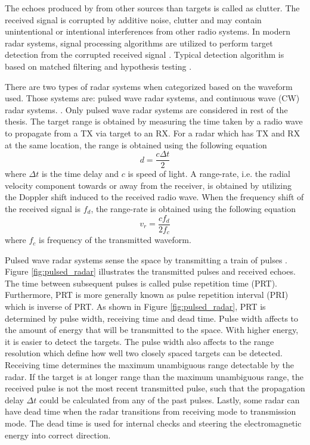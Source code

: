 \documentclass[english, 12pt, a4paper, elec, utf8, a-1b, online]{aaltothesis}
\newcommand{\dt}{\Delta t}
\begin{document}
The echoes produced by from other sources than targets is called as clutter.
The received signal is corrupted by additive noise, clutter and may contain unintentional or intentional interferences from other radio systems.
In modern radar systems, signal processing algorithms are utilized to perform target detection from the corrupted received signal \cite{Mahafza2015}.
Typical detection algorithm is based on matched filtering and hypothesis testing \cite{Mahafza2015}.

There are two types of radar systems when categorized based on the waveform used.
Those systems are: pulsed wave radar systems, and continuous wave (CW) radar systems.  \cite{Mahafza2015}.
Only pulsed wave radar systems are considered in rest of the thesis.
The target range is obtained by measuring the time taken by a radio wave to propagate from a TX via target to an RX.
For a radar which has TX and RX at the same location, the range is obtained using the following equation
\begin{equation}
    d = \frac{ c\dt}{2} 
\end{equation}
where $\dt$ is the time delay and $c$ is speed of light.
A range-rate, i.e. the radial velocity component towards or away from the receiver, is obtained by utilizing the Doppler shift induced to the received radio wave.
When the frequency shift of the received signal is $f_d$, the range-rate is obtained using the following equation
\begin{equation}
    v_r = \frac{cf_d}{2f_c}
\end{equation}
where $f_c$ is frequency of the transmitted waveform.


Pulsed wave radar systems sense the space by transmitting a train of pulses \cite{Mahafza2015}.
Figure \ref{fig:pulsed_radar} illustrates the transmitted pulses and received echoes.
The time between subsequent pulses is called pulse repetition time (PRT). 
Furthermore, PRT is more generally known as pulse repetition interval (PRI) which is inverse of PRT.
As shown in Figure \ref{fig:pulsed_radar}, PRT is determined by pulse width, receiving time and dead time.
Pulse width affects to the amount of energy that will be transmitted to the space.
With higher energy, it is easier to detect the targets.
The pulse width also affects to the range resolution which define how well two closely spaced targets can be detected.
Receiving time determines the maximum unambiguous range detectable by the radar.
If the target is at longer range than the maximum unambiguous range, the received pulse is not the most recent transmitted pulse, such that the propagation delay $\dt$ could be calculated from any of the past pulses.
Lastly, some radar can have dead time when the radar transitions from receiving mode to transmission mode.
The dead time is used for internal checks and steering the electromagnetic energy into correct direction.
\end{document}
